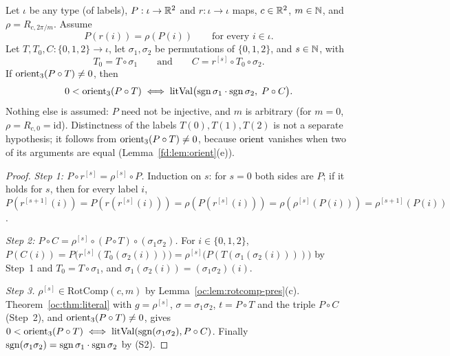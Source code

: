 \begin{theorem}\label{oc:thm:encoder}
Let $\iota$ be any type (of labels), $P:\iota\to\mathbb R^2$ and $r:\iota\to\iota$ maps, $c\in\mathbb R^2$, $m\in\mathbb N$, and
$\rho=R_{c,2\pi/m}$. Assume
\[P(r(i))=\rho(P(i))\qquad\text{for every } i\in\iota .\]
Let $T,T_0,C:\{0,1,2\}\to\iota$, let $\sigma_1,\sigma_2$ be permutations of $\{0,1,2\}$, and $s\in\mathbb N$, with
\[T_0=T\circ\sigma_1\qquad\text{and}\qquad C=r^{[s]}\circ T_0\circ\sigma_2 .\]
If $\operatorname{orient}_3(P\circ T)\ne0$, then
\[0<\operatorname{orient}_3(P\circ T)\iff\operatorname{litVal}\bigl(\operatorname{sgn}\sigma_1\cdot\operatorname{sgn}\sigma_2,\;P\circ C\bigr).\]
Nothing else is assumed: $P$ need not be injective, and $m$ is arbitrary (for $m=0$,
$\rho=R_{c,0}=\mathrm{id}$). Distinctness of the labels $T(0),T(1),T(2)$ is not a separate hypothesis; it
follows from $\operatorname{orient}_3(P\circ T)\ne0$, because $\operatorname{orient}$ vanishes when two of its arguments are equal
(Lemma~\ref{fd:lem:orient}(e)).
\end{theorem}
\begin{proof}
\emph{Step 1: $P\circ r^{[s]}=\rho^{[s]}\circ P$.} Induction on $s$: for $s=0$ both sides are $P$; if it
holds for $s$, then for every label $i$,
$P(r^{[s+1]}(i))=P(r(r^{[s]}(i)))=\rho(P(r^{[s]}(i)))=\rho(\rho^{[s]}(P(i)))=\rho^{[s+1]}(P(i))$.

\emph{Step 2: $P\circ C=\rho^{[s]}\circ(P\circ T)\circ(\sigma_1\sigma_2)$.} For $i\in\{0,1,2\}$,
$P(C(i))=P\bigl(r^{[s]}(T_0(\sigma_2(i)))\bigr)=\rho^{[s]}\bigl(P(T(\sigma_1(\sigma_2(i))))\bigr)$ by
Step~1 and $T_0=T\circ\sigma_1$, and $\sigma_1(\sigma_2(i))=(\sigma_1\sigma_2)(i)$.

\emph{Step 3.} $\rho^{[s]}\in\mathrm{RotComp}(c,m)$ by Lemma~\ref{oc:lem:rotcomp-pres}(c). Theorem~\ref{oc:thm:literal}
with $g=\rho^{[s]}$, $\sigma=\sigma_1\sigma_2$, $t=P\circ T$ and the triple $P\circ C$ (Step~2), and
$\operatorname{orient}_3(P\circ T)\ne0$, gives $0<\operatorname{orient}_3(P\circ T)\iff\operatorname{litVal}(\operatorname{sgn}(\sigma_1\sigma_2),P\circ
C)$. Finally $\operatorname{sgn}(\sigma_1\sigma_2)=\operatorname{sgn}\sigma_1\cdot\operatorname{sgn}\sigma_2$ by (S2).
\end{proof}

